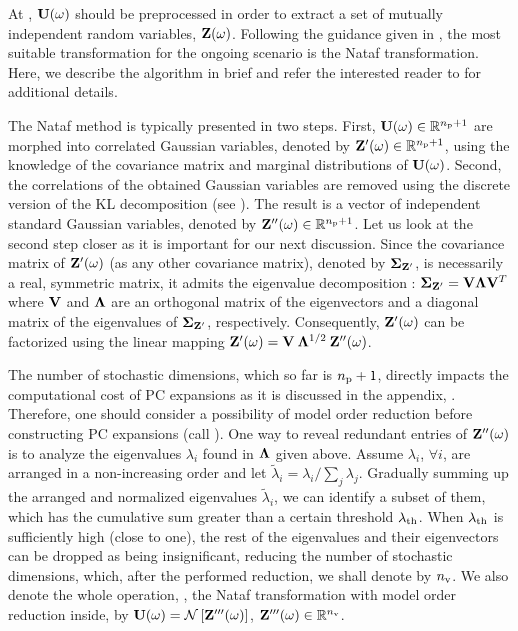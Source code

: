 At , $\mathbf{U}(\omega)$ should be preprocessed in order to extract a set of mutually independent random variables, $\mathbf{Z}(\omega)$.
Following the guidance given in , the most suitable transformation for the ongoing scenario is the Nataf transformation.
Here, we describe the algorithm in brief and refer the interested reader to \cite{li2008} for additional details.

The Nataf method is typically presented in two steps.
First, $\mathbf{U}(\omega) \in \mathbb{R}^{{n_\text{p}} + 1}$ are morphed into correlated Gaussian variables, denoted by $\mathbf{Z}'(\omega) \in \mathbb{R}^{{n_\text{p}} + 1}$, using the knowledge of the covariance matrix and marginal distributions of $\mathbf{U}(\omega)$.
Second, the correlations of the obtained Gaussian variables are removed using the discrete version of the KL decomposition (see ).
The result is a vector of independent standard Gaussian variables, denoted by $\mathbf{Z}''(\omega) \in \mathbb{R}^{{n_\text{p}} + 1}$.
Let us look at the second step closer as it is important for our next discussion.
Since the covariance matrix of $\mathbf{Z}'(\omega)$ (as any other covariance matrix), denoted by $\mCov_{\vZ'}$, is necessarily a real, symmetric matrix, it admits the eigenvalue decomposition \cite{press2007}: $\mCov_{\vZ'} = \m{V} \m{\Lambda} \m{V}^T$ where $\m{V}$ and $\m{\Lambda}$ are an orthogonal matrix of the eigenvectors and a diagonal matrix of the eigenvalues of $\mCov_{\vZ'}$, respectively.
Consequently, $\mathbf{Z}'(\omega)$ can be factorized using the linear mapping $\vZ'(\o) = \m{V} \: \m{\Lambda}^{1/2} \: \vZ''(\o)$.

The number of stochastic dimensions, which so far is ${n_\text{p}} + 1$, directly impacts the computational cost of PC expansions as it is discussed in the appendix, .
Therefore, one should consider a possibility of model order reduction before constructing PC expansions (call ).
One way to reveal redundant entries of $\mathbf{Z}''(\omega)$ is to analyze the eigenvalues $\lambda_i$ found in $\m{\Lambda}$ given above.
Assume $\lambda_i$, $\forall i$, are arranged in a non-increasing order and let $\tilde{\lambda}_i = \lambda_i / \sum_j \lambda_j$.
Gradually summing up the arranged and normalized eigenvalues $\tilde{\lambda}_i$, we can identify a subset of them, which has the cumulative sum greater than a certain threshold $\lambda_\text{th}$.
When $\lambda_\text{th}$ is sufficiently high (close to one), the rest of the eigenvalues and their eigenvectors can be dropped as being insignificant, reducing the number of stochastic dimensions, which, after the performed reduction, we shall denote by ${n_\text{v}}$.
We also denote the whole operation, \ie, the Nataf transformation with model order reduction inside, by $\mathbf{U}(\omega) = \mathcal{N}\left[\mathbf{Z}'''(\omega)\right]$, $\mathbf{Z}'''(\omega) \in \mathbb{R}^{n_\text{v}}$.

